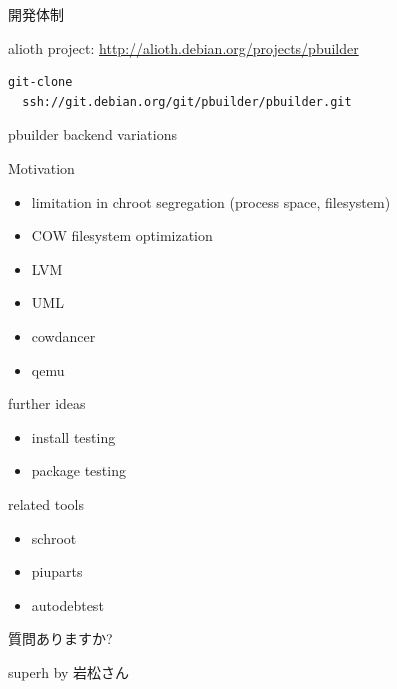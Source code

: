 \documentclass[cjk,dvipdfmx,12pt]{beamer}
\begin{document}
\begin{frame}[containsverbatim]{開発体制}

alioth project: \url{http://alioth.debian.org/projects/pbuilder}

\begin{verbatim}
git-clone
  ssh://git.debian.org/git/pbuilder/pbuilder.git
\end{verbatim}
\end{frame}

\begin{frame}{pbuilder backend variations}
\begin{minipage}{0.5\hsize}
 Motivation
\begin{itemize}
 \item limitation in chroot segregation (process space, filesystem)
 \item COW filesystem optimization
\end{itemize}
\end{minipage}\begin{minipage}{0.4\hsize}
  \begin{itemize}
  \item LVM
  \item UML
  \item cowdancer
  \item qemu
 \end{itemize}
\end{minipage}
\end{frame}

\begin{frame}{further ideas}
 \begin{itemize}
  \item install testing
  \item package testing
 \end{itemize}
\end{frame}

\begin{frame}{related tools}
 \begin{itemize}
  \item schroot
  \item piuparts
  \item autodebtest
 \end{itemize}
\end{frame}

\begin{frame}{}
 質問ありますか?
\end{frame}

\begin{frame}{}
superh by 岩松さん
\end{frame}
\end{document}
